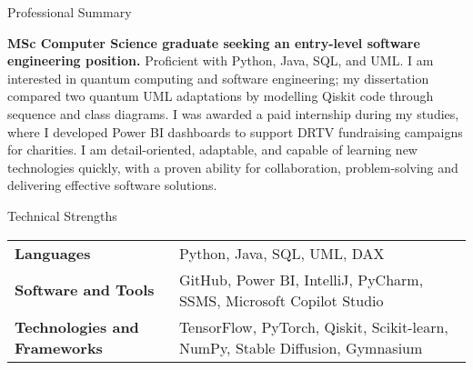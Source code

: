 \documentclass[
	11pt, %
]{resume} %
\begin{document}

\begin{rSection}{Professional Summary}

\textbf{MSc Computer Science graduate seeking an entry-level software engineering position.} Proficient with Python, Java, SQL, and UML. I am interested in quantum computing and software engineering; my dissertation compared two quantum UML adaptations by modelling Qiskit code through sequence and class diagrams. I was awarded a paid internship during my studies, where I developed Power BI dashboards to support DRTV fundraising campaigns for charities. I am detail-oriented, adaptable, and capable of learning new technologies quickly, with a proven ability for collaboration, problem-solving and delivering effective software solutions.

\end{rSection}



\begin{rSection}{Technical Strengths}

    \begin{tabular}{@{} p{4cm} p{11cm} @{}}
        \textbf{Languages} & Python, Java, SQL, UML, DAX \\ 
        \textbf{Software and Tools} & GitHub, Power BI, IntelliJ, PyCharm, SSMS, Microsoft Copilot Studio \\ 
        \textbf{Technologies and Frameworks} & TensorFlow, PyTorch, Qiskit, Scikit-learn, NumPy, Stable Diffusion, Gymnasium\\
    \end{tabular}

\end{rSection}



\end{document}
